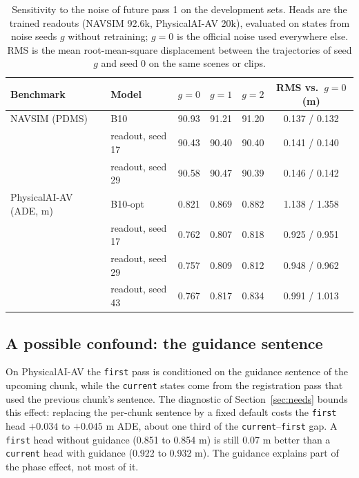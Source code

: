 \documentclass[10pt]{article}
\newcommand{\first}{\texttt{first}}
\newcommand{\current}{\texttt{current}}
\begin{document}
\begin{table}[t]
\caption{Sensitivity to the noise of future pass 1 on the development sets. Heads are the trained readouts (NAVSIM 92.6k, PhysicalAI-AV 20k), evaluated on states from noise seeds $g$ without retraining; $g = 0$ is the official noise used everywhere else. RMS is the mean root-mean-square displacement between the trajectories of seed $g$ and seed 0 on the same scenes or clips.}
\label{tab:noise}
\begin{center}
\footnotesize
\setlength{\tabcolsep}{4pt}
\begin{tabular}{llcccc}
\toprule
Benchmark & Model & $g = 0$ & $g = 1$ & $g = 2$ & RMS vs.\ $g = 0$ (m) \\
\midrule
NAVSIM (PDMS) & B10 & 90.93 & 91.21 & 91.20 & 0.137 / 0.132 \\
 & readout, seed 17 & 90.43 & 90.40 & 90.40 & 0.141 / 0.140 \\
 & readout, seed 29 & 90.58 & 90.47 & 90.39 & 0.146 / 0.142 \\
\midrule
PhysicalAI-AV (ADE, m) & B10-opt & 0.821 & 0.869 & 0.882 & 1.138 / 1.358 \\
 & readout, seed 17 & 0.762 & 0.807 & 0.818 & 0.925 / 0.951 \\
 & readout, seed 29 & 0.757 & 0.809 & 0.812 & 0.948 / 0.962 \\
 & readout, seed 43 & 0.767 & 0.817 & 0.834 & 0.991 / 1.013 \\
\bottomrule
\end{tabular}
\end{center}
\end{table}

\subsection{A possible confound: the guidance sentence}
\label{sec:guidance-confound}

On PhysicalAI-AV the \first{} pass is conditioned on the guidance sentence of the upcoming chunk, while the \current{} states come from the registration pass that used the previous chunk's sentence. The diagnostic of Section~\ref{sec:needs} bounds this effect: replacing the per-chunk sentence by a fixed default costs the \first{} head $+0.034$ to $+0.045$ m ADE, about one third of the \current{}--\first{} gap. A \first{} head without guidance (0.851 to 0.854 m) is still 0.07 m better than a \current{} head with guidance (0.922 to 0.932 m). The guidance explains part of the phase effect, not most of it.
\end{document}
